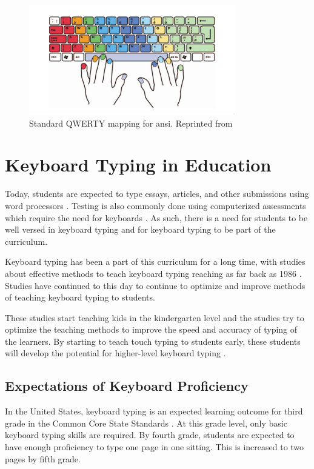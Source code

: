 \documentclass{report}
\begin{document}
\begin{figure}[H]
	\centering
	\includegraphics[width=0.8\textwidth]{touch-type.png}
	\caption{Standard QWERTY mapping for \ac{ansi}. Reprinted from }
	\label{fig:touch-type}
	\centering
\end{figure}


\section{Keyboard Typing in Education}

Today, students are expected to type essays, articles, and other submissions
using word processors \parencite{poole2016}. Testing is also commonly done using
computerized assessments which require the need for keyboards
\parencite{moodle}. As such, there is a need for students to be well versed in
keyboard typing and for keyboard typing to be part of the curriculum.

Keyboard typing has been a part of this curriculum for a long time, with studies
about effective methods to teach keyboard typing reaching as far back as 1986
\parencite{hoot1986}. Studies have continued to this day to continue to optimize
and improve methods of teaching keyboard typing to students.

These studies start teaching kids in the kindergarten level and the studies try
to optimize the teaching methods to improve the speed and accuracy of typing of
the learners. By starting to teach touch typing to students early, these
students will develop the potential for higher-level keyboard typing
\parencite{donica2018}.

\subsection{Expectations of Keyboard Proficiency}

In the United States, keyboard typing is an expected learning outcome for third
grade in the Common Core State Standards \parencite{ccs}. At this grade level,
only basic keyboard typing skills are required. By fourth grade, students are
expected to have enough proficiency to type one page in one sitting. This is
increased to two pages by fifth grade.
\end{document}
